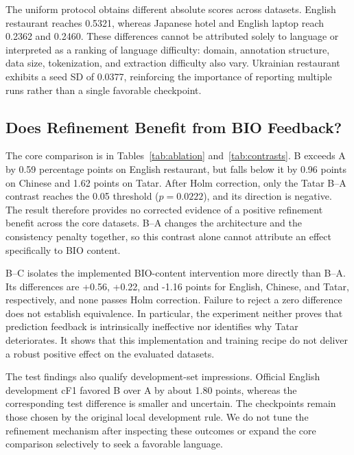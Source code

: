 \documentclass[conference]{IEEEtran}
\begin{document}
The uniform protocol obtains different absolute scores across datasets. English restaurant reaches 0.5321, whereas Japanese hotel and English laptop reach 0.2362 and 0.2460. These differences cannot be attributed solely to language or interpreted as a ranking of language difficulty: domain, annotation structure, data size, tokenization, and extraction difficulty also vary. Ukrainian restaurant exhibits a seed SD of 0.0377, reinforcing the importance of reporting multiple runs rather than a single favorable checkpoint.

\subsection{Does Refinement Benefit from BIO Feedback?}


The core comparison is in Tables~\ref{tab:ablation} and~\ref{tab:contrasts}. B exceeds A by 0.59 percentage points on English restaurant, but falls below it by 0.96 points on Chinese and 1.62 points on Tatar. After Holm correction, only the Tatar B--A contrast reaches the 0.05 threshold ($p=0.0222$), and its direction is negative. The result therefore provides no corrected evidence of a positive refinement benefit across the core datasets. B--A changes the architecture and the consistency penalty together, so this contrast alone cannot attribute an effect specifically to BIO content.

B--C isolates the implemented BIO-content intervention more directly than B--A. Its differences are +0.56, +0.22, and -1.16 points for English, Chinese, and Tatar, respectively, and none passes Holm correction. Failure to reject a zero difference does not establish equivalence. In particular, the experiment neither proves that prediction feedback is intrinsically ineffective nor identifies why Tatar deteriorates. It shows that this implementation and training recipe do not deliver a robust positive effect on the evaluated datasets.

The test findings also qualify development-set impressions. Official English development cF1 favored B over A by about 1.80 points, whereas the corresponding test difference is smaller and uncertain. The checkpoints remain those chosen by the original local development rule. We do not tune the refinement mechanism after inspecting these outcomes or expand the core comparison selectively to seek a favorable language.
\end{document}
